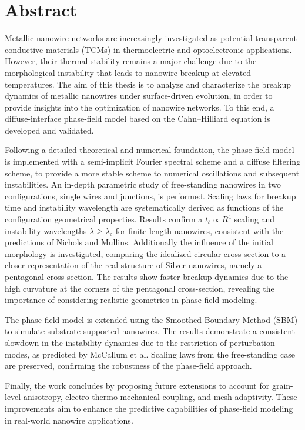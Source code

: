 \chapter*{Abstract}
Metallic nanowire networks are increasingly investigated as potential transparent conductive materials (TCMs) in thermoelectric and optoelectronic applications. However, their thermal stability remains a major challenge due to the morphological instability that leads to nanowire breakup at elevated temperatures. The aim of this thesis is to analyze and characterize the breakup dynamics of metallic nanowires under surface-driven evolution, in order to provide insights into the optimization of nanowire networks. To this end, a diffuse-interface phase-field model based on the Cahn–Hilliard equation is developed and validated.

Following a detailed theoretical and numerical foundation, the phase-field model is implemented with a semi-implicit Fourier spectral scheme and a diffuse filtering scheme, to provide a more stable scheme to numerical oscillations and subsequent instabilities. An in-depth parametric study of free-standing nanowires in two configurations, single wires and junctions, is performed. Scaling laws for breakup time and instability wavelength are systematically derived as functions of the configuration geometrical properties. Results confirm a $t_b \propto R^4$ scaling and instability wavelengths $\lambda \geq \lambda_c$ for finite length nanowires, consistent with the predictions of Nichols and Mullins. Additionally the influence of the initial morphology is investigated, comparing the idealized circular cross-section to a closer representation of the real structure of Silver nanowires, namely a pentagonal cross-section. The results show faster breakup dynamics due to the high curvature at the corners of the pentagonal cross-section, revealing the importance of considering realistic geometries in phase-field modeling.

The phase-field model is extended using the Smoothed Boundary Method (SBM) to simulate substrate-supported nanowires. The results demonstrate a consistent slowdown in the instability dynamics due to the restriction of perturbation modes, as predicted by McCallum et al. Scaling laws from the free-standing case are preserved, confirming the robustness of the phase-field approach. 

Finally, the work concludes by proposing future extensions to account for grain-level anisotropy, electro-thermo-mechanical coupling, and mesh adaptivity. These improvements aim to enhance the predictive capabilities of phase-field modeling in real-world nanowire applications.


